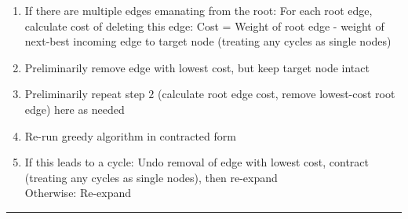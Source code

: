 \begin{itemize}
\begin{enumerate}
        \item If there are multiple edges emanating from the root: For each root edge, calculate cost of deleting this edge: Cost = Weight of root edge - weight of next-best incoming edge to target node (treating any cycles as single nodes)
        \item Preliminarily remove edge with lowest cost, but keep target node intact
        \item Preliminarily repeat step $2$ (calculate root edge cost, remove lowest-cost root edge) here as needed
        \item Re-run greedy algorithm in contracted form
        \item If this leads to a cycle: Undo removal of edge with lowest cost, contract (treating any cycles as single nodes), then re-expand\\
        Otherwise: Re-expand
    \end{enumerate}
\end{itemize}

{\color{black}\hrule height 0.001mm}

